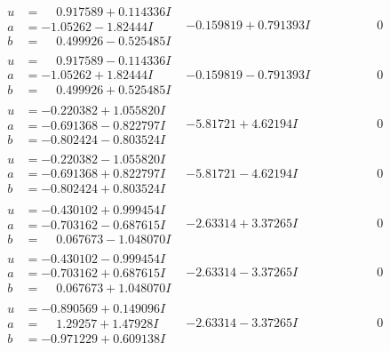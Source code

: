\documentclass[1p]{elsarticle_modified}
\theoremstyle{definition}
\begin{document}
$$\begin{array}{c|c|c}
\begin{aligned}
u &= \phantom{-}0.917589 + 0.114336 I \\
a &= -1.05262 - 1.82444 I \\
b &= \phantom{-}0.499926 - 0.525485 I\end{aligned}
 & -0.159819 + 0.791393 I & \phantom{-0.000000 } 0 \\ \hline\begin{aligned}
u &= \phantom{-}0.917589 - 0.114336 I \\
a &= -1.05262 + 1.82444 I \\
b &= \phantom{-}0.499926 + 0.525485 I\end{aligned}
 & -0.159819 - 0.791393 I & \phantom{-0.000000 } 0 \\ \hline\begin{aligned}
u &= -0.220382 + 1.055820 I \\
a &= -0.691368 - 0.822797 I \\
b &= -0.802424 - 0.803524 I\end{aligned}
 & -5.81721 + 4.62194 I & \phantom{-0.000000 } 0 \\ \hline\begin{aligned}
u &= -0.220382 - 1.055820 I \\
a &= -0.691368 + 0.822797 I \\
b &= -0.802424 + 0.803524 I\end{aligned}
 & -5.81721 - 4.62194 I & \phantom{-0.000000 } 0 \\ \hline\begin{aligned}
u &= -0.430102 + 0.999454 I \\
a &= -0.703162 - 0.687615 I \\
b &= \phantom{-}0.067673 - 1.048070 I\end{aligned}
 & -2.63314 + 3.37265 I & \phantom{-0.000000 } 0 \\ \hline\begin{aligned}
u &= -0.430102 - 0.999454 I \\
a &= -0.703162 + 0.687615 I \\
b &= \phantom{-}0.067673 + 1.048070 I\end{aligned}
 & -2.63314 - 3.37265 I & \phantom{-0.000000 } 0 \\ \hline\begin{aligned}
u &= -0.890569 + 0.149096 I \\
a &= \phantom{-}1.29257 + 1.47928 I \\
b &= -0.971229 + 0.609138 I\end{aligned}
 & -2.63314 - 3.37265 I & \phantom{-0.000000 } 0 \\ \hline\begin{aligned}

\end{aligned}
\end{array}$$
\end{document}

